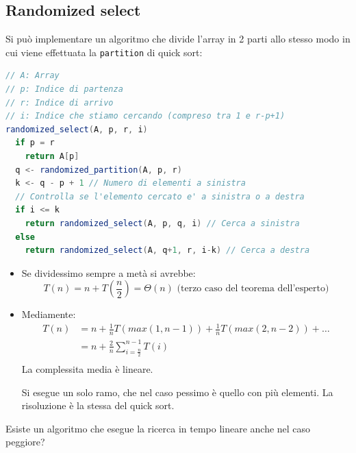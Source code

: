 \documentclass[a4paper]{article}
\begin{document}
\subsection{Randomized select}
Si può implementare un algoritmo che divide l'array in 2 parti allo stesso modo
in cui viene effettuata la \texttt{partition} di quick sort:
\begin{lstlisting}[language=Scala]
// A: Array
// p: Indice di partenza
// r: Indice di arrivo
// i: Indice che stiamo cercando (compreso tra 1 e r-p+1)
randomized_select(A, p, r, i)
  if p = r
    return A[p]
  q <- randomized_partition(A, p, r)
  k <- q - p + 1 // Numero di elementi a sinistra 
  // Controlla se l'elemento cercato e' a sinistra o a destra
  if i <= k
    return randomized_select(A, p, q, i) // Cerca a sinistra
  else
    return randomized_select(A, q+1, r, i-k) // Cerca a destra
\end{lstlisting}
\begin{itemize}
  \item 
    Se dividessimo sempre a metà si avrebbe:
    \[
      T(n) = n + T\left(\frac{n}{2}\right) = \Theta(n) \text{ (terzo caso del teorema dell'esperto)}
    \] 

  \item Mediamente:
    \[
      \begin{aligned}
        T(n) &= n + \frac{1}{n} T \left( max(1,n-1) \right) + \frac{1}{n} T \left( max(2,n-2) \right)
        + \dots\\
             &= n + \frac{2}{n} \sum_{i=\frac{n}{2}}^{n-1} T \left( i \right)\\
      \end{aligned}
    \] 
    La complessita media è lineare.

    Si esegue un solo ramo, che nel caso pessimo è quello con più elementi. La risoluzione
    è la stessa del quick sort.
\end{itemize}
Esiste un algoritmo che esegue la ricerca in tempo lineare anche nel caso peggiore?
\end{document}
